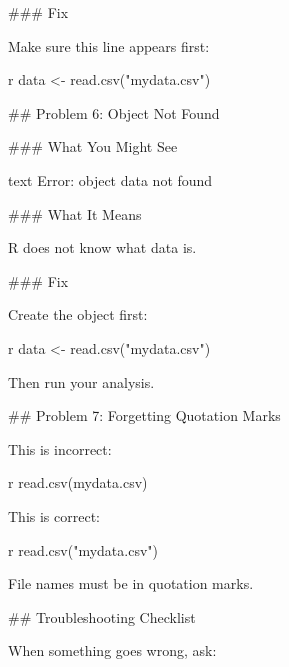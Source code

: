 \documentclass[
  letterpaper,
  DIV=11,
  numbers=noendperiod]{scrartcl}
\newenvironment{Shaded}{\begin{snugshade}}{\end{snugshade}}
\newcommand{\FunctionTok}[1]{\textcolor[rgb]{0.28,0.35,0.67}{#1}}
\newcommand{\InformationTok}[1]{\textcolor[rgb]{0.37,0.37,0.37}{#1}}
\newcommand{\NormalTok}[1]{\textcolor[rgb]{0.00,0.23,0.31}{#1}}
\newcommand{\OtherTok}[1]{\textcolor[rgb]{0.00,0.23,0.31}{#1}}
\newcommand{\StringTok}[1]{\textcolor[rgb]{0.13,0.47,0.30}{#1}}
\begin{document}
\begin{Shaded}
\begin{Highlighting}[]
\FunctionTok{\#\#\# Fix}

\NormalTok{Make sure this line appears first:}

\InformationTok{\textasciigrave{}\textasciigrave{}\textasciigrave{}r}
\NormalTok{data }\OtherTok{\textless{}{-}} \FunctionTok{read.csv}\NormalTok{(}\StringTok{"mydata.csv"}\NormalTok{)}
\InformationTok{\textasciigrave{}\textasciigrave{}\textasciigrave{}}

\FunctionTok{\#\# Problem 6: Object Not Found}

\FunctionTok{\#\#\# What You Might See}

\InformationTok{\textasciigrave{}\textasciigrave{}\textasciigrave{}text}
\InformationTok{Error: object \textquotesingle{}data\textquotesingle{} not found}
\InformationTok{\textasciigrave{}\textasciigrave{}\textasciigrave{}}

\FunctionTok{\#\#\# What It Means}

\NormalTok{R does not know what }\InformationTok{\textasciigrave{}data\textasciigrave{}}\NormalTok{ is.}

\FunctionTok{\#\#\# Fix}

\NormalTok{Create the object first:}

\InformationTok{\textasciigrave{}\textasciigrave{}\textasciigrave{}r}
\NormalTok{data }\OtherTok{\textless{}{-}} \FunctionTok{read.csv}\NormalTok{(}\StringTok{"mydata.csv"}\NormalTok{)}
\InformationTok{\textasciigrave{}\textasciigrave{}\textasciigrave{}}

\NormalTok{Then run your analysis.}

\FunctionTok{\#\# Problem 7: Forgetting Quotation Marks}

\NormalTok{This is incorrect:}

\InformationTok{\textasciigrave{}\textasciigrave{}\textasciigrave{}r}
\FunctionTok{read.csv}\NormalTok{(mydata.csv)}
\InformationTok{\textasciigrave{}\textasciigrave{}\textasciigrave{}}

\NormalTok{This is correct:}

\InformationTok{\textasciigrave{}\textasciigrave{}\textasciigrave{}r}
\FunctionTok{read.csv}\NormalTok{(}\StringTok{"mydata.csv"}\NormalTok{)}
\InformationTok{\textasciigrave{}\textasciigrave{}\textasciigrave{}}

\NormalTok{File names must be in quotation marks.}

\FunctionTok{\#\# Troubleshooting Checklist}

\NormalTok{When something goes wrong, ask:}


\end{Highlighting}
\end{Shaded}
\end{document}
